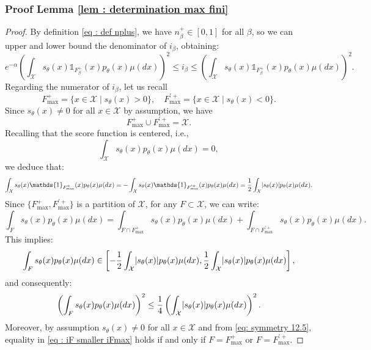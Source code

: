 \documentclass[a4paper, 11pt]{article}
\theoremstyle{definition}
\newcommand{\cX}{{\mathcal{X}}}
\newcommand{\indi}[1]{\mathds{1}_{#1}}
\DeclarePairedDelimiter{\abs}{\lvert}{\rvert}
\begin{document}
{\subsubsection{Proof Lemma \ref{lem :  determination max fini}}
\begin{proof}
By definition \eqref{eq : def nplus}, we have $n_\beta^+ \in [0,1]$ for all $\beta$, so we can upper and lower bound the denominator of $i_\beta$, obtaining:
\begin{equation} \label{eq : deno not so important fini}
	e^{-\alpha} \left( \int_\cX s_{\theta}(x) \indi{F^+_\beta}(x) p_\theta(x) \mu(dx) \right)^2
	\le i_\beta \le 
	\left( \int_\cX s_{\theta}(x) \indi{F^+_\beta}(x) p_\theta(x) \mu(dx) \right)^2.
\end{equation}
Regarding the numerator of $i_\beta$, let us recall
\[
F_\text{max}^+ = \{x \in \mathcal{X} \mid s_\theta(x) > 0\}, \quad
F_\text{max}^{\prime +} = \{x \in \mathcal{X} \mid s_\theta(x) < 0\}.
\]
Since $s_\theta(x) \neq 0$ for all $x \in \cX$ by assumption, we have 
\[
F_\text{max}^+ \cup F_\text{max}^{\prime +} = \cX.
\]
Recalling that the score function is centered, i.e., 
\[
\int_\cX s_\theta(x) p_\theta(x) \mu(dx) = 0,
\]
we deduce that:
\begin{equation} \label{eq: symmetry 12.5}
	\int_\cX s_{\theta}(x) \indi{F^+_\text{max}}(x) p_\theta(x) \mu(dx)
	= - \int_\cX s_{\theta}(x) \indi{F^{\prime +}_\text{max}}(x) p_\theta(x) \mu(dx)
	= \frac{1}{2} \int_\cX \abs{s_{\theta}(x)} p_\theta(x) \mu(dx).
\end{equation}
Since $\{F_\text{max}^+, F_\text{max}^{\prime +}\}$ is a partition of $\cX$, for any $F \subset \cX$, we can write:
\[
\int_F s_\theta(x) p_\theta(x) \mu(dx) 
= \int_{F \cap F^+_\text{max}} s_\theta(x) p_\theta(x) \mu(dx)
+ \int_{F \cap F^{\prime +}_\text{max}} s_\theta(x) p_\theta(x) \mu(dx).
\]
This implies:
\[
\int_F s_\theta(x) p_\theta(x) \mu(dx) \in 
\left[ -\frac{1}{2} \int_\cX \abs{s_{\theta}(x)} p_\theta(x) \mu(dx), 
        \frac{1}{2} \int_\cX \abs{s_{\theta}(x)} p_\theta(x) \mu(dx) \right],
\]
and consequently:
\begin{equation} \label{eq : iF smaller iFmax}
	\left( \int_F s_\theta(x) p_\theta(x) \mu(dx) \right)^2
	\le \frac{1}{4} \left( \int_\cX \abs{s_{\theta}(x)} p_\theta(x) \mu(dx) \right)^2.
\end{equation}
Moreover, by assumption $s_\theta(x) \neq 0$ for all $x \in \cX$ and from \eqref{eq: symmetry 12.5}, equality in \eqref{eq : iF smaller iFmax} holds if and only if $F = F_\text{max}^+$ or $F = F_\text{max}^{\prime +}$.


\end{proof}}
\end{document}
